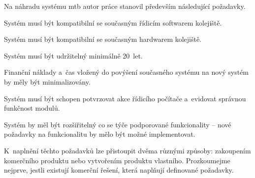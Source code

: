 Na náhradu systému \gls{mtb} autor práce stanovil především následující
požadavky.

\begin{compactenum}
\item Systém musí být kompatibilní se současným řídicím softwarem kolejiště.
\item Systém musí být kompatibilní se současným hardwarem kolejiště.
\item Systém musí být udržitelný minimálně 20~let.
\item Finanční náklady a~čas vložený do povýšení současného systému na nový
	systém by měly být minimalizovány.
\item Systém musí být schopen potvrzovat akce řídicího počítače a~evidovat správnou
	funkčnost modulů.
\item Systém by měl být rozšiřitelný co se týče podporované funkcionality –
	nové požadavky na funkcionalitu by mělo být možné implementovat.
\end{compactenum}

K~naplnění těchto požadavků lze přistoupit dvěma různými způsoby: zakoupením
komerčního produktu nebo vytvořením produktu vlastního. Prozkoumejme nejprve,
jestli existují komerční řešení, která naplňují definované požadavky.
